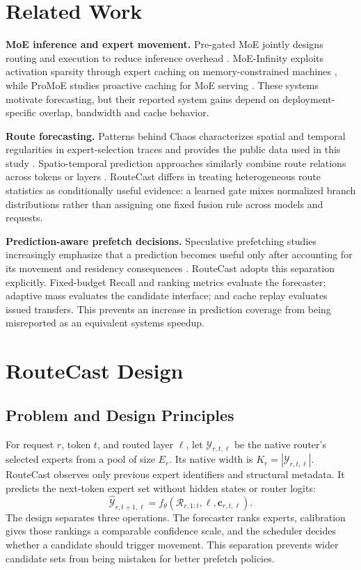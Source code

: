 \documentclass[conference]{IEEEtran}
\begin{document}
\section{Related Work}
\textbf{MoE inference and expert movement.}
Pre-gated MoE jointly designs routing and execution to reduce inference overhead \cite{pregated}. MoE-Infinity exploits activation sparsity through expert caching on memory-constrained machines \cite{moeinfinity}, while ProMoE studies proactive caching for MoE serving \cite{promoe}. These systems motivate forecasting, but their reported system gains depend on deployment-specific overlap, bandwidth and cache behavior.

\textbf{Route forecasting.}
Patterns behind Chaos characterizes spatial and temporal regularities in expert-selection traces and provides the public data used in this study \cite{patterns}. Spatio-temporal prediction approaches similarly combine route relations across tokens or layers \cite{stmoe}. RouteCast differs in treating heterogeneous route statistics as conditionally useful evidence: a learned gate mixes normalized branch distributions rather than assigning one fixed fusion rule across models and requests.

\textbf{Prediction-aware prefetch decisions.}
Speculative prefetching studies increasingly emphasize that a prediction becomes useful only after accounting for its movement and residency consequences \cite{specmd,specprefetch}. RouteCast adopts this separation explicitly. Fixed-budget Recall and ranking metrics evaluate the forecaster; adaptive mass evaluates the candidate interface; and cache replay evaluates issued transfers. This prevents an increase in prediction coverage from being misreported as an equivalent systems speedup.

\section{RouteCast Design}
\subsection{Problem and Design Principles}
For request $r$, token $t$, and routed layer $\ell$, let $\mathcal{Y}_{r,t,\ell}$ be the native router's selected experts from a pool of size $E_r$. Its native width is $K_r=|\mathcal{Y}_{r,t,\ell}|$. RouteCast observes only previous expert identifiers and structural metadata. It predicts the next-token expert set without hidden states or router logits:
\begin{equation}
\hat{\mathcal{Y}}_{r,t+1,\ell}
=f_\theta(\mathcal{R}_{r,1:t},\ell,\mathbf{c}_{r,t,\ell}).
\label{eq:task}
\end{equation}
The design separates three operations. The forecaster ranks experts, calibration gives those rankings a comparable confidence scale, and the scheduler decides whether a candidate should trigger movement. This separation prevents wider candidate sets from being mistaken for better prefetch policies.
\end{document}
